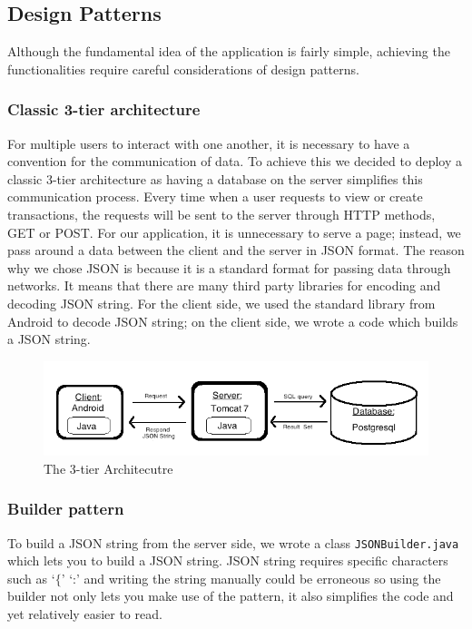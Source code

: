 \documentclass[a4paper,11pt]{article}
\begin{document}
\subsection*{Design Patterns}
Although the fundamental idea of the application is fairly simple, achieving the functionalities require careful considerations of design patterns. 

\subsubsection*{Classic 3-tier architecture}
For multiple users to interact with one another, it is necessary to have a convention for the communication of data. To achieve this we decided to deploy a classic 3-tier architecture as having a database on the server simplifies this communication process. Every time when a user requests to view or create transactions, the requests will be sent to the server through HTTP methods, GET or POST. For our application, it is unnecessary to serve a page; instead, we pass around a data between the client and the server in JSON format. The reason why we chose JSON is because it is a standard format for passing data through networks. It means that there are many third party libraries for encoding and decoding JSON string. For the client side, we used the standard library from Android to decode JSON string; on the client side, we wrote a code which builds a JSON string. 

\begin{figure}[ht]
\begin{center}
\advance\leftskip-3cm
\advance\rightskip-3cm
\includegraphics[keepaspectratio=true,scale=0.5]{3tier}
\caption{The 3-tier Architecutre}
\label{visina8}
\end{center}
\end{figure}

\subsubsection*{Builder pattern}
To build a JSON string from the server side, we wrote a class \texttt{JSONBuilder.java} which lets you to build a JSON string. JSON string requires specific characters such as `$\lbrace$' `:' and writing the string manually could be erroneous so using the builder not only lets you make use of the pattern, it also simplifies the code and yet relatively easier to read. 
\end{document}
